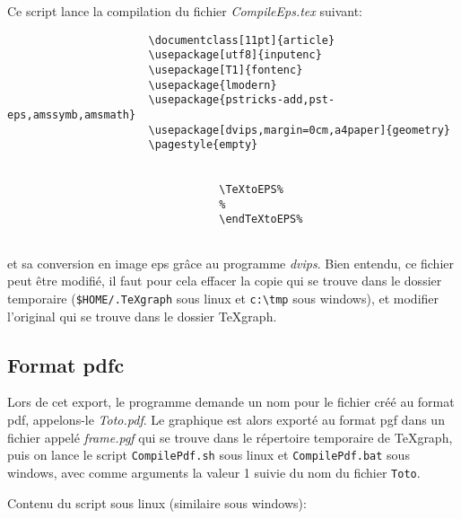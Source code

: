 Ce script lance la compilation du fichier \textit{CompileEps.tex} suivant:

\begin{verbatim}
                      \documentclass[11pt]{article}
                      \usepackage[utf8]{inputenc}
                      \usepackage[T1]{fontenc}
                      \usepackage{lmodern}
                      \usepackage{pstricks-add,pst-eps,amssymb,amsmath}
                      \usepackage[dvips,margin=0cm,a4paper]{geometry}
                      \pagestyle{empty}

                      
                                 \TeXtoEPS%
                                 %
                                 \endTeXtoEPS%
                      
\end{verbatim}

et sa conversion en image eps grâce au programme \textit{dvips}. Bien entendu, ce fichier peut être modifié, il faut pour cela effacer la copie qui se trouve dans le dossier temporaire (\verb|$HOME/.TeXgraph| sous linux et \verb|c:\tmp| sous windows), et modifier l'original qui se trouve dans le dossier TeXgraph.

\subsection{Format pdfc}

Lors de cet export, le programme demande un nom pour le fichier créé au format pdf, appelons-le \textit{Toto.pdf}. Le graphique est alors exporté au format pgf dans un fichier appelé \textit{frame.pgf} qui se trouve dans le répertoire temporaire de TeXgraph, puis on lance  le script \verb|CompilePdf.sh| sous linux et \verb|CompilePdf.bat| sous windows, avec comme arguments la valeur 1 suivie du nom du fichier \verb|Toto|.

Contenu du script sous linux (similaire sous windows):

